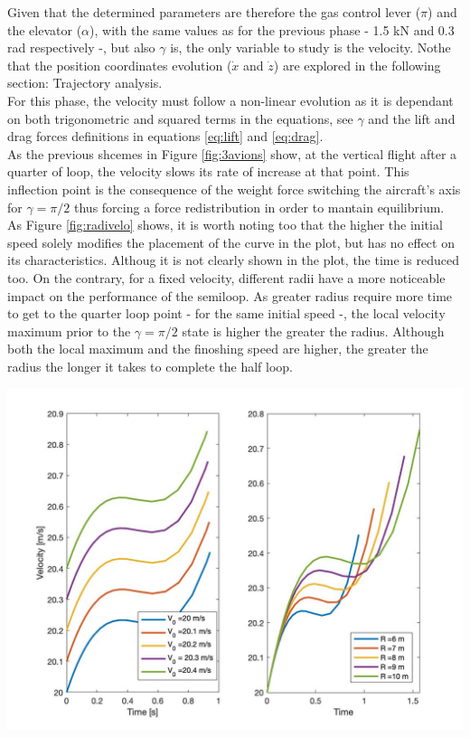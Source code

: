 Given that the determined parameters are therefore the gas control lever ($\pi$) and the elevator ($\alpha$), with the same values as for the previous phase - 1.5 kN and 0.3 rad respectively -, but also $\gamma$ is, the only variable to study is the velocity. Nothe that the position coordinates evolution ($\Dot{x}$ and $\Dot{z}$) are explored in the following section: Trajectory analysis.\\

For this phase, the velocity must follow a non-linear evolution as it is dependant on both trigonometric and squared terms in the equations, see $\gamma$ and the lift and drag forces definitions in equations \ref{eq:lift} and \ref{eq:drag}. \\
As the previous shcemes in Figure \ref{fig:3avions} show, at the vertical flight after a quarter of loop, the velocity slows its rate of increase at that point. This inflection point is the consequence of the weight force switching the aircraft's axis for $\gamma=\pi/2$ thus forcing a force redistribution in order to mantain equilibrium.\\
As Figure \ref{fig:radivelo} shows, it is worth noting too that the higher the initial speed solely modifies the placement of the curve in the plot, but has no effect on its characteristics. Althoug it is not clearly shown in the plot, the time is reduced too. On the contrary, for a fixed velocity, different radii have a more noticeable impact on the performance of the semiloop. As greater radius require more time to get to the quarter loop point - for the same initial speed -, the local velocity maximum prior to the $\gamma=\pi/2$ state is higher the greater the radius. Although both the local maximum and the finoshing speed are higher, the greater the radius the longer it takes to complete the half loop.

\begin{center}
	\includegraphics[width=\linewidth]{../matlab/radivelo.jpg}
	\vspace{0.5cm}
	\vspace{0.25cm}
	\label{fig:radivelo}
\end{center}

